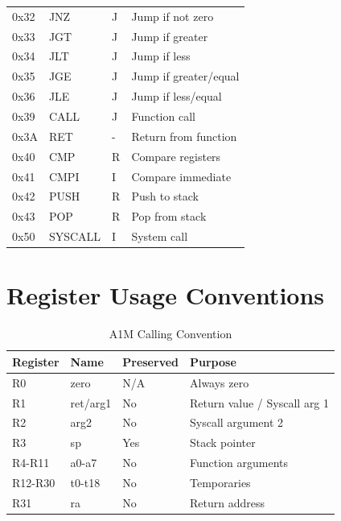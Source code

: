\documentclass[12pt,a4paper,oneside]{book}
\begin{document}
\begin{table}[H]
\begin{tabularx}{\textwidth}{|l|l|l|X|}
0x32 & JNZ & J & Jump if not zero \\
0x33 & JGT & J & Jump if greater \\
0x34 & JLT & J & Jump if less \\
0x35 & JGE & J & Jump if greater/equal \\
0x36 & JLE & J & Jump if less/equal \\
0x39 & CALL & J & Function call \\
0x3A & RET & - & Return from function \\
0x40 & CMP & R & Compare registers \\
0x41 & CMPI & I & Compare immediate \\
0x42 & PUSH & R & Push to stack \\
0x43 & POP & R & Pop from stack \\
0x50 & SYSCALL & I & System call \\
\hline
\end{tabularx}
\end{table}

\chapter{Register Usage Conventions}

\begin{table}[H]
\centering
\caption{A1M Calling Convention}
\begin{tabularx}{\textwidth}{|l|l|l|X|}
\hline
\textbf{Register} & \textbf{Name} & \textbf{Preserved} & \textbf{Purpose} \\
\hline
R0 & zero & N/A & Always zero \\
R1 & ret/arg1 & No & Return value / Syscall arg 1 \\
R2 & arg2 & No & Syscall argument 2 \\
R3 & sp & Yes & Stack pointer \\
R4-R11 & a0-a7 & No & Function arguments \\
R12-R30 & t0-t18 & No & Temporaries \\
R31 & ra & No & Return address \\
\hline
\end{tabularx}
\end{table}

\end{document}
